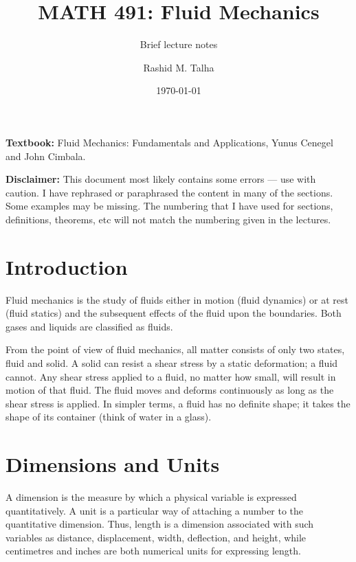 \documentclass[11pt]{penrose}
\title{MATH 491: Fluid Mechanics}
\subtitle{Brief lecture notes}
\author{Rashid M. Talha}
\affiliation{School of Natural Sciences, NUST}
\date{\today}
\begin{document}
\maketitle

\textbf{Textbook:} Fluid Mechanics: Fundamentals and Applications, Yunus Cenegel and John Cimbala.

\textbf{Disclaimer:} This document most likely contains some errors --- use with caution. I have rephrased or paraphrased the content in many of the sections. Some examples may be missing. The numbering that I have used for sections, definitions, theorems, etc will not match the numbering given in the lectures.

\section{Introduction}
Fluid mechanics is the study of fluids either in motion (fluid dynamics) or at rest (fluid statics) and the subsequent effects of the fluid upon the boundaries. Both gases and liquids are classified as fluids.

From the point of view of fluid mechanics, all matter consists of only two states, fluid and solid. A solid can resist a shear stress by a static deformation; a fluid cannot. Any shear stress applied to a fluid, no matter how small, will result in motion of that fluid. The fluid moves and deforms continuously as long as the shear stress is applied. In simpler terms, a fluid has no definite shape; it takes the shape of its container (think of water in a glass).


\section{Dimensions and Units}
A dimension is the measure by which a physical variable is expressed quantitatively. A unit is a particular way of attaching a number to the quantitative dimension. Thus, length is a dimension associated with such variables as distance, displacement, width, deflection, and height, while centimetres and inches are both numerical units for expressing length.
\end{document}
